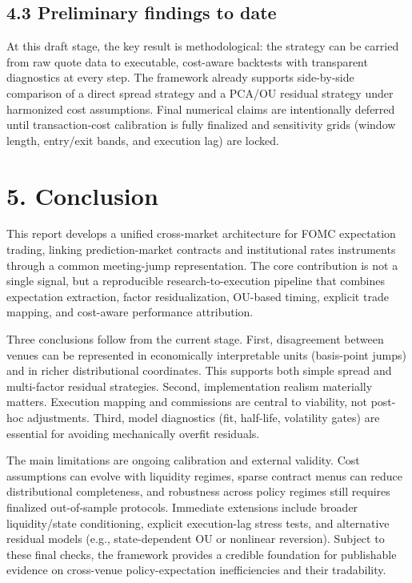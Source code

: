 \subsection*{4.3 Preliminary findings to date}

At this draft stage, the key result is methodological: the strategy can be carried from raw quote data to executable, cost-aware backtests with transparent diagnostics at every step. The framework already supports side-by-side comparison of a direct spread strategy and a PCA/OU residual strategy under harmonized cost assumptions. Final numerical claims are intentionally deferred until transaction-cost calibration is fully finalized and sensitivity grids (window length, entry/exit bands, and execution lag) are locked.

\section*{5. Conclusion}

This report develops a unified cross-market architecture for FOMC expectation trading, linking prediction-market contracts and institutional rates instruments through a common meeting-jump representation. The core contribution is not a single signal, but a reproducible research-to-execution pipeline that combines expectation extraction, factor residualization, OU-based timing, explicit trade mapping, and cost-aware performance attribution.

Three conclusions follow from the current stage. First, disagreement between venues can be represented in economically interpretable units (basis-point jumps) and in richer distributional coordinates. This supports both simple spread and multi-factor residual strategies. Second, implementation realism materially matters. Execution mapping and commissions are central to viability, not post-hoc adjustments. Third, model diagnostics (fit, half-life, volatility gates) are essential for avoiding mechanically overfit residuals.

The main limitations are ongoing calibration and external validity. Cost assumptions can evolve with liquidity regimes, sparse contract menus can reduce distributional completeness, and robustness across policy regimes still requires finalized out-of-sample protocols. Immediate extensions include broader liquidity/state conditioning, explicit execution-lag stress tests, and alternative residual models (e.g., state-dependent OU or nonlinear reversion). Subject to these final checks, the framework provides a credible foundation for publishable evidence on cross-venue policy-expectation inefficiencies and their tradability.
